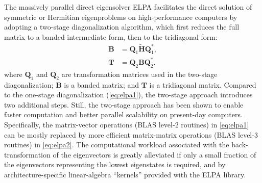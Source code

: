 \documentclass{report}
\begin{document}
The massively parallel direct eigensolver ELPA \cite{elpa_auckenthaler_2011,elpa_marek_2014} facilitates the direct solution of symmetric or Hermitian eigenproblems on high-performance computers by adopting a two-stage diagonalization algorithm, which first reduces the full matrix to a banded intermediate form, then to the tridiagonal form:
\begin{equation}
\label{eq:elpa2}
\begin{split}
\boldsymbol{B} & = \boldsymbol{Q}_1 \boldsymbol{\tilde{H}} \boldsymbol{Q}_1^* ,\\
\boldsymbol{T} & = \boldsymbol{Q}_2 \boldsymbol{B} \boldsymbol{Q}_2^* .
\end{split}
\end{equation}
where $\boldsymbol{Q}_1$ and $\boldsymbol{Q}_2$ are transformation matrices used in the two-stage diagonalization; $\boldsymbol{B}$ is a banded matrix; and $\boldsymbol{T}$ is a tridiagonal matrix. Compared to the one-stage diagonalization (\ref{eq:elpa1}), the two-stage approach introduces two additional steps. Still, the two-stage approach has been shown to enable faster computation and better parallel scalability on present-day computers. Specifically, the matrix-vector operations (BLAS level-2 routines) in \ref{eq:elpa1} can be mostly replaced by more efficient matrix-matrix operations (BLAS level-3 routines) in \ref{eq:elpa2}. The computational workload associated with the back-transformation of the eigenvectors is greatly alleviated if only a small fraction of the eigenvectors representing the lowest eigenstates is required, and by architecture-specific linear-algebra ``kernels'' provided with the ELPA library.
\end{document}
